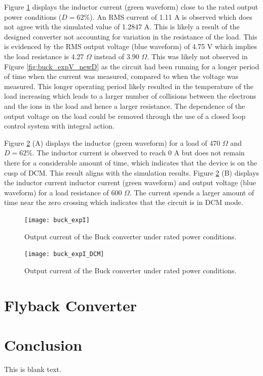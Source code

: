 \documentclass[12pt,twoside]{scrartcl}
\begin{document}
\noindent Figure \ref{fig:buck_expI} displays the inductor current (green waveform) close to the rated output power conditions ($D = 62$\%). An RMS current of 1.11 A is observed which does not agree with the simulated value of 1.2847 A. This is likely a result of the designed converter not accounting for variation in the resistance of the load. This is evidenced by the RMS output voltage (blue waveform) of 4.75 V which implies the load resistance is 4.27 $\Omega$ instead of 3.90 $\Omega$. This was likely not observed in Figure \ref{fig:buck_expV_newD} as the circuit had been running for a longer period of time when the current was measured, compared to when the voltage was measured. This longer operating period likely resulted in the temperature of the load increasing which leads to a larger number of collisions between the electrons and the ions in the load and hence a larger resistance. The dependence of the output voltage on the load could be removed through the use of a closed loop control system with integral action. \par
\vspace{5mm}
\noindent Figure \ref{fig:buck_expI_DCM} (A) displays the inductor (green waveform) for a load of 470 $\Omega$ and $D = 62$\%. The inductor current is observed to reach 0 A but does not remain there for a considerable amount of time, which indicates that the device is on the cusp of DCM. This result aligns with the simulation results. Figure \ref{fig:buck_expI_DCM} (B) displays the inductor current inductor current (green waveform) and output voltage (blue waveform) for a load resistance of 600 $\Omega$. The current spends a larger amount of time near the zero crossing which indicates that the circuit is in DCM mode.

\begin{figure}[h]
    \centering
    \texttt{[image: buck\_expI]}
    \caption{Output current of the Buck converter under rated power conditions.}
    \label{fig:buck_expI}
\end{figure}

\begin{figure}[h]
    \centering
    \texttt{[image: buck\_expI\_DCM]}
    \caption{Output current of the Buck converter under rated power conditions.}
    \label{fig:buck_expI_DCM}
\end{figure}

\newpage
\section{Flyback Converter}
\citep{BS412-EN}
\citep{jay1995write}
\newpage
\section{Conclusion}
This is blank text.
\newpage


\end{document}
